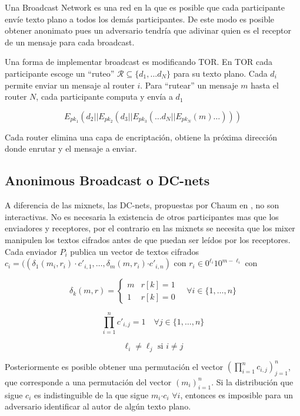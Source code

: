 Una Broadcast Network es una red en la que es posible que cada participante
envíe texto plano a todos los demás participantes. De este modo es
posible obtener anonimato pues un adversario tendría que adivinar
quien es el receptor de un mensaje para cada broadcast.

Una forma de implementar broadcast es modificando TOR. En TOR cada
participante escoge un {}``ruteo'' $\mathcal{R}\subseteq\{d_{1},\ldots d_{N}\}$
para su texto plano. Cada $d_{i}$ permite enviar un mensaje al router
$i$. Para {}``rutear'' un mensaje $m$ hasta el router $N$, cada
participante computa y envía a $d_{1}$

\[
E_{pk_{1}}(d_{2}||E_{pk_{2}}(d_{3}||E_{pk_{3}}(\ldots d_{N}||E_{pk_{N}}(m)\ldots)))\]


Cada router elimina una capa de encriptación, obtiene la próxima dirección
donde enrutar y el mensaje a enviar.


\subsection{Anonimous Broadcast o DC-nets}

A diferencia de las mixnets, las DC-nets, propuestas por Chaum en
\cite{journals/joc/Chaum88}, no son interactivas. No es necesaria
la existencia de otros participantes mas que los enviadores y receptores,
por el contrario en las mixnets se necesita que los mixer manipulen
los textos cifrados antes de que puedan ser leídos por los receptores.
Cada enviador $P_{i}$ publica un vector de textos cifrados $c_{i}=((\delta_{1}(m_{i},r_{i})\cdot c'_{i,1},\ldots,\delta_{m}(m,r_{i})\text{·}c'_{i,n})$
con $r_{i}\in0^{\ell_{i}}10^{m-\ell_{i}}$ con

\[
\delta_{k}(m,r)=\begin{cases}
m & r[k]=1\\
1 & r[k]=0\end{cases}\quad\forall i\in\{1,\ldots,n\}\]


\[
\prod_{i=1}^{n}c'_{i,j}=1\quad\forall j\in\{1,\ldots,n\}\]


\[
\ell_{i}\neq\ell_{j}\mbox{ si }i\neq j\]


Posteriormente es posible obtener una permutación el vector $(\prod_{i=1}^{n}c{}_{i,j})_{j=1}^{n}$,
que corresponde a una permutación del vector $(m_{i})_{i=1}^{n}$.
Si la distribución que sigue $c_{i}$ es indistinguible de la que
sigue $m_{i}\text{·}c_{i}$ $\forall i$, entonces es imposible para
un adversario identificar al autor de algún texto plano.


